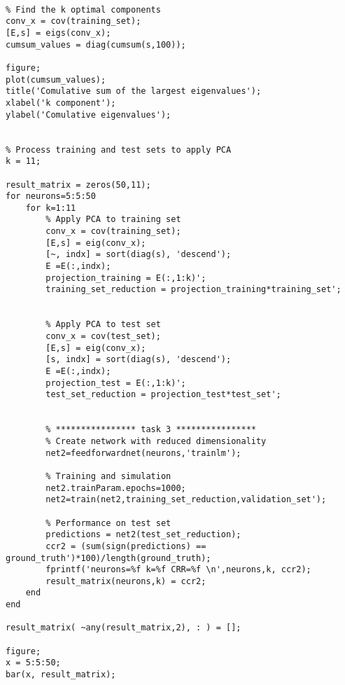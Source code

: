 \begin{lstlisting}[frame=single]
% **************** task 2 ****************

% Find the k optimal components
conv_x = cov(training_set);
[E,s] = eigs(conv_x);
cumsum_values = diag(cumsum(s,100));

figure;
plot(cumsum_values);
title('Comulative sum of the largest eigenvalues');
xlabel('k component');
ylabel('Comulative eigenvalues');


% Process training and test sets to apply PCA
k = 11;

result_matrix = zeros(50,11);
for neurons=5:5:50
    for k=1:11
        % Apply PCA to training set
        conv_x = cov(training_set);
        [E,s] = eig(conv_x);
        [~, indx] = sort(diag(s), 'descend');
        E =E(:,indx);
        projection_training = E(:,1:k)';
        training_set_reduction = projection_training*training_set';


        % Apply PCA to test set
        conv_x = cov(test_set);
        [E,s] = eig(conv_x);
        [s, indx] = sort(diag(s), 'descend');
        E =E(:,indx);
        projection_test = E(:,1:k)';
        test_set_reduction = projection_test*test_set';


        % **************** task 3 ****************
        % Create network with reduced dimensionality
        net2=feedforwardnet(neurons,'trainlm');

        % Training and simulation
        net2.trainParam.epochs=1000;
        net2=train(net2,training_set_reduction,validation_set');

        % Performance on test set
        predictions = net2(test_set_reduction);
        ccr2 = (sum(sign(predictions) == ground_truth')*100)/length(ground_truth);
        fprintf('neurons=%f k=%f CRR=%f \n',neurons,k, ccr2);
        result_matrix(neurons,k) = ccr2;
    end 
end

result_matrix( ~any(result_matrix,2), : ) = [];

figure;
x = 5:5:50;
bar(x, result_matrix);
\end{lstlisting}